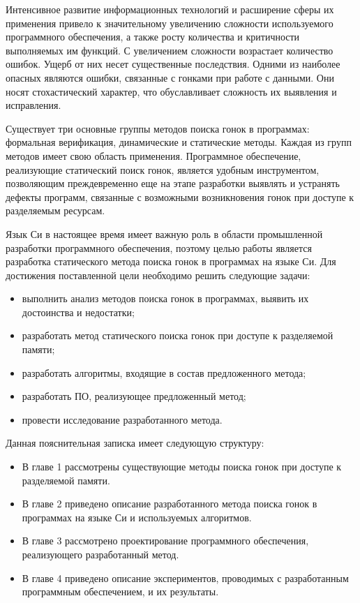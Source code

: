 \Introduction

Интенсивное развитие информационных технологий и расширение сферы их применения привело к значительному увеличению сложности используемого программного обеспечения, а также росту количества и критичности выполняемых им функций. С увеличением сложности возрастает количество ошибок. Ущерб от них несет существенные последствия. Одними из наиболее опасных являются ошибки, связанные с гонками при работе с данными. Они носят стохастический характер, что обуславливает сложность их выявления и исправления.

Существует три основные группы методов поиска гонок в программах: формальная верификация, динамические и статические методы. Каждая из групп методов имеет свою область применения. Программное обеспечение, реализующие статический поиск гонок, является удобным инструментом, позволяющим преждевременно еще на этапе разработки выявлять и устранять дефекты программ, связанные с возможными возникновения гонок при доступе к разделяемым ресурсам.

Язык Си в настоящее время имеет важную роль в области промышленной разработки программного обеспечения, поэтому целью работы является разработка статического метода поиска гонок в программах на языке Си. Для достижения поставленной цели необходимо решить следующие задачи:

\begin{itemize}
\item выполнить анализ методов поиска гонок в программах, выявить их достоинства и недостатки;
\item разработать метод статического поиска гонок при доступе к разделяемой памяти;
\item разработать алгоритмы, входящие в состав предложенного метода;
\item разработать ПО, реализующее предложенный метод;
\item провести исследование разработанного метода.
\end{itemize}

Данная пояснительная записка имеет следующую структуру:

\begin{itemize}
  \item В главе 1 рассмотрены существующие методы поиска гонок при доступе к разделяемой памяти.
  \item В главе 2 приведено описание разработанного метода поиска гонок в программах на языке Си и используемых алгоритмов.
  \item В главе 3 рассмотрено проектирование программного обеспечения, реализующего разработанный метод.
  \item В главе 4 приведено описание экспериментов, проводимых с разработанным программным обеспечением, и их результаты.
\end{itemize}
